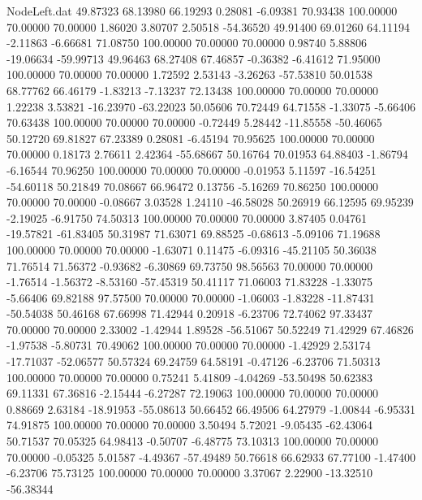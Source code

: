 \begin{filecontents}{NodeLeft.dat}
  49.87323   68.13980   66.19293     0.28081   -6.09381   70.93438  100.00000   70.00000   70.00000    1.86020    3.80707    2.50518  -54.36520
  49.91400   69.01260   64.11194    -2.11863   -6.66681   71.08750  100.00000   70.00000   70.00000    0.98740    5.88806  -19.06634  -59.99713
  49.96463   68.27408   67.46857    -0.36382   -6.41612   71.95000  100.00000   70.00000   70.00000    1.72592    2.53143   -3.26263  -57.53810
  50.01538   68.77762   66.46179    -1.83213   -7.13237   72.13438  100.00000   70.00000   70.00000    1.22238    3.53821  -16.23970  -63.22023
  50.05606   70.72449   64.71558    -1.33075   -5.66406   70.63438  100.00000   70.00000   70.00000   -0.72449    5.28442  -11.85558  -50.46065
  50.12720   69.81827   67.23389     0.28081   -6.45194   70.95625  100.00000   70.00000   70.00000    0.18173    2.76611    2.42364  -55.68667
  50.16764   70.01953   64.88403    -1.86794   -6.16544   70.96250  100.00000   70.00000   70.00000   -0.01953    5.11597  -16.54251  -54.60118
  50.21849   70.08667   66.96472     0.13756   -5.16269   70.86250  100.00000   70.00000   70.00000   -0.08667    3.03528    1.24110  -46.58028
  50.26919   66.12595   69.95239    -2.19025   -6.91750   74.50313  100.00000   70.00000   70.00000    3.87405    0.04761  -19.57821  -61.83405
  50.31987   71.63071   69.88525    -0.68613   -5.09106   71.19688  100.00000   70.00000   70.00000   -1.63071    0.11475   -6.09316  -45.21105
  50.36038   71.76514   71.56372    -0.93682   -6.30869   69.73750   98.56563   70.00000   70.00000   -1.76514   -1.56372   -8.53160  -57.45319
  50.41117   71.06003   71.83228    -1.33075   -5.66406   69.82188   97.57500   70.00000   70.00000   -1.06003   -1.83228  -11.87431  -50.54038
  50.46168   67.66998   71.42944     0.20918   -6.23706   72.74062   97.33437   70.00000   70.00000    2.33002   -1.42944    1.89528  -56.51067
  50.52249   71.42929   67.46826    -1.97538   -5.80731   70.49062  100.00000   70.00000   70.00000   -1.42929    2.53174  -17.71037  -52.06577
  50.57324   69.24759   64.58191    -0.47126   -6.23706   71.50313  100.00000   70.00000   70.00000    0.75241    5.41809   -4.04269  -53.50498
  50.62383   69.11331   67.36816    -2.15444   -6.27287   72.19063  100.00000   70.00000   70.00000    0.88669    2.63184  -18.91953  -55.08613
  50.66452   66.49506   64.27979    -1.00844   -6.95331   74.91875  100.00000   70.00000   70.00000    3.50494    5.72021   -9.05435  -62.43064
  50.71537   70.05325   64.98413    -0.50707   -6.48775   73.10313  100.00000   70.00000   70.00000   -0.05325    5.01587   -4.49367  -57.49489
  50.76618   66.62933   67.77100    -1.47400   -6.23706   75.73125  100.00000   70.00000   70.00000    3.37067    2.22900  -13.32510  -56.38344

\end{filecontents}
